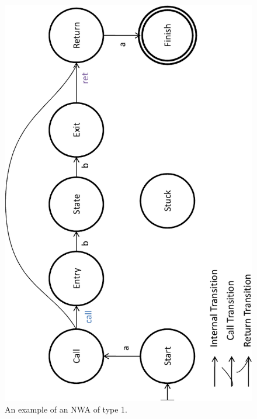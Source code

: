 \begin{figure}[htb]
  \centering
    \includegraphics[width=12cm]{Figures/Figure1}
  \caption{An example of an NWA of type 1.}
  \label{Fi:Example1}
\end{figure}


